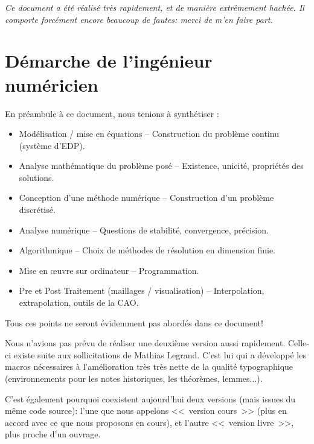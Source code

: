 \documentclass[11pt,pdflatex]{book}
\begin{document}
\medskip
\emph{Ce document a été réalisé très rapidement, et de manière extrêmement hachée.
Il comporte forcément encore beaucoup de fautes: merci de m'en faire part.}




\bigskip
\section*{Démarche de l'ingénieur numéricien}

En préambule à ce document, nous tenions à synthétiser :
\begin{itemize}
   \item Modélisation / mise en équations -- Construction du problème continu (système d'EDP).
   \item Analyse mathématique du problème posé -- Existence, unicité, propriétés des solutions.
   \item Conception d'une méthode numérique -- Construction d'un problème discrétisé.
   \item Analyse numérique -- Questions de stabilité, convergence, précision.
   \item Algorithmique -- Choix de méthodes de résolution en dimension finie.
   \item Mise en œuvre sur ordinateur -- Programmation.
   \item Pre et Post Traitement (maillages / visualisation) -- Interpolation, extrapolation, outils de la CAO.
\end{itemize}

\medskip
Tous ces points ne seront évidemment pas abordés dans ce document!
\vfill
\noindent
{}

Nous n'avions pas prévu de réaliser une deuxième version aussi rapidement.
Celle-ci existe suite aux sollicitations de Mathias Legrand.
C'est lui  qui a développé les macros nécessaires à l'amélioration très très nette de la 
qualité typographique (environnements pour les notes historiques, les théorèmes, lemmes...).

C'est également pourquoi coexistent aujourd'hui deux versions (mais issues du même code source):
l'une que nous appelons <<~version cours~>> (plus en accord avec ce que nous proposons en cours),
et l'autre <<~version livre~>>, plus proche d'un ouvrage.
\end{document}
